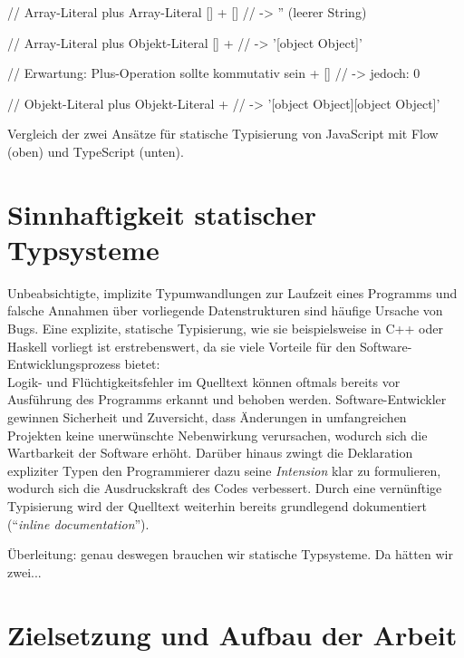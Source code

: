 \bigskip
\begin{listing}[!h]
\begin{jscode}
// Array-Literal plus Array-Literal
[] + []  // -> '' (leerer String)

// Array-Literal plus Objekt-Literal
[] + {}  // -> '[object Object]'

// Erwartung: Plus-Operation sollte kommutativ sein
{} + []  // -> jedoch: 0

// Objekt-Literal plus Objekt-Literal
{} + {}  // -> '[object Object][object Object]'
\end{jscode}
\caption{Vergleich der zwei Ansätze für statische Typisierung von JavaScript mit Flow (oben) und TypeScript (unten).}
\label{code:example}
\end{listing}






\section{Sinnhaftigkeit statischer Typsysteme}

Unbeabsichtigte, implizite Typumwandlungen zur Laufzeit eines Programms und falsche Annahmen über vorliegende Datenstrukturen sind häufige Ursache von Bugs. Eine explizite, statische Typisierung, wie sie beispielsweise in C++ oder Haskell vorliegt ist erstrebenswert, da sie viele Vorteile für den Software-Entwicklungsprozess bietet:\\
Logik- und Flüchtigkeitsfehler im Quelltext können oftmals bereits vor Ausführung des Programms erkannt und behoben werden. Software-Entwickler gewinnen Sicherheit und Zuversicht, dass Änderungen in umfangreichen Projekten keine unerwünschte Nebenwirkung verursachen, wodurch sich die Wartbarkeit der Software erhöht. Darüber hinaus zwingt die Deklaration expliziter Typen den Programmierer dazu seine \emph{Intension} klar zu formulieren, wodurch sich die Ausdruckskraft des Codes verbessert. Durch eine vernünftige Typisierung wird der Quelltext weiterhin bereits grundlegend dokumentiert (\enquote{\textit{inline documentation}}).


Überleitung: genau deswegen brauchen wir statische Typsysteme. Da hätten wir zwei...

\section{Zielsetzung und Aufbau der Arbeit}
